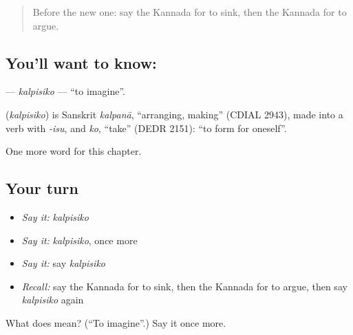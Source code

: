 \label{lesson:KA-C240-kalpisiko}



\begin{quote}
Before the new one: say the Kannada for to sink, then the Kannada for to argue.
\end{quote}

\subsection*{You'll want to know: }
\textbf{} — \emph{kalpisiko} — \textquotedblleft{}to imagine\textquotedblright{}.

\begin{cousinweb}
\textbf{} (\emph{kalpisiko}) is Sanskrit \emph{kalpanā}, \textquotedblleft{}arranging, making\textquotedblright{} (CDIAL 2943), made into a verb with \emph{-isu}, and \emph{ko}, \textquotedblleft{}take\textquotedblright{} (DEDR 2151): \textquotedblleft{}to form for oneself\textquotedblright{}.
\end{cousinweb}

\begin{grammarlens}[title={What you've built}]
One more word for this chapter.
\end{grammarlens}

\subsection*{Your turn}
\begin{itemize}
\raggedright
  \item \emph{Say it:} \emph{kalpisiko}
  \item \emph{Say it:} \emph{kalpisiko}, once more
  \item \emph{Say it:} say \emph{kalpisiko}
  \item \emph{Recall:} say the Kannada for to sink, then the Kannada for to argue, then say \emph{kalpisiko} again
\end{itemize}

\begin{tcolorbox}[breakable,colback=teal!4,colframe=teal!35!black,title={Before you move on}]
What does  mean? (\textquotedblleft{}To imagine\textquotedblright{}.) Say it once more.
\end{tcolorbox}
